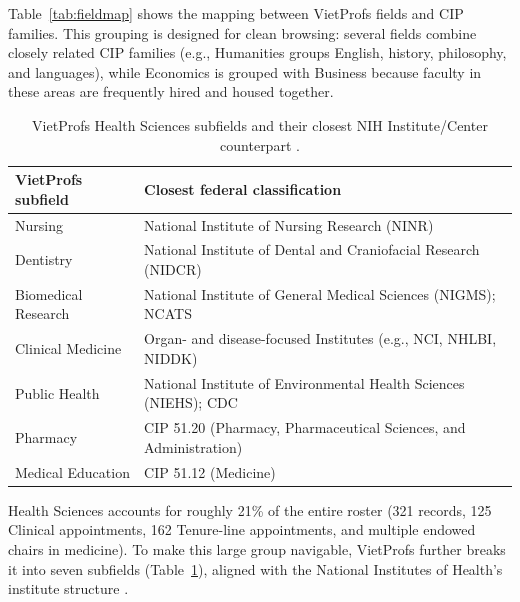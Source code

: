 \documentclass[11pt]{article}
\begin{document}
Table~\ref{tab:fieldmap} shows the mapping between VietProfs fields and CIP families.
This grouping is designed for clean browsing: several fields combine closely related CIP families (e.g., Humanities groups English, history, philosophy, and languages), while Economics is grouped with Business because faculty in these areas are frequently hired and housed together.

\begin{table}[t]
\centering
\caption{VietProfs Health Sciences subfields and their closest NIH Institute/Center counterpart \cite{nih_ics}.}
\label{tab:healthnih}
\small
\begin{tabularx}{\linewidth}{@{}lX@{}}
\toprule
VietProfs subfield & Closest federal classification \\
\midrule
Nursing & National Institute of Nursing Research (NINR) \\
Dentistry & National Institute of Dental and Craniofacial Research (NIDCR) \\
Biomedical Research & National Institute of General Medical Sciences (NIGMS); NCATS \\
Clinical Medicine & Organ- and disease-focused Institutes (e.g., NCI, NHLBI, NIDDK) \\
Public Health & National Institute of Environmental Health Sciences (NIEHS); CDC \\
Pharmacy & CIP 51.20 (Pharmacy, Pharmaceutical Sciences, and Administration) \\
Medical Education & CIP 51.12 (Medicine) \\
\bottomrule
\end{tabularx}
\end{table}

Health Sciences accounts for roughly 21\% of the entire roster (321 records, 125 Clinical appointments, 162 Tenure-line appointments, and multiple endowed chairs in medicine). To make this large group navigable, VietProfs further breaks it into seven subfields (Table~\ref{tab:healthnih}), aligned with the National Institutes of Health's institute structure \cite{nih_ics}.
\end{document}
